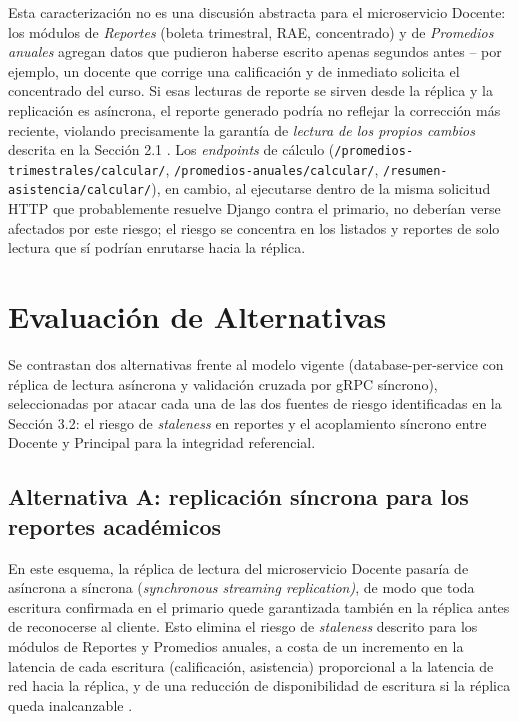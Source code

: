 \documentclass[11pt,a4paper]{article}
\begin{document}
Esta caracterización no es una discusión abstracta para el microservicio Docente: los módulos de \emph{Reportes} (boleta trimestral, RAE, concentrado) y de \emph{Promedios anuales} agregan datos que pudieron haberse escrito apenas segundos antes -- por ejemplo, un docente que corrige una calificación y de inmediato solicita el concentrado del curso. Si esas lecturas de reporte se sirven desde la réplica y la replicación es asíncrona, el reporte generado podría no reflejar la corrección más reciente, violando precisamente la garantía de \emph{lectura de los propios cambios} descrita en la Sección 2.1 \cite{viotti2016}. Los \emph{endpoints} de cálculo (\texttt{/promedios-trimestrales/calcular/}, \texttt{/promedios-anuales/calcular/}, \texttt{/resumen-asistencia/calcular/}), en cambio, al ejecutarse dentro de la misma solicitud
HTTP que probablemente resuelve Django contra el primario, no deberían verse afectados por este riesgo; el riesgo se concentra en los listados y reportes de solo lectura que sí podrían enrutarse hacia la réplica.

\section{Evaluación de Alternativas}

Se contrastan dos alternativas frente al modelo vigente (database-per-service con réplica de lectura asíncrona y validación cruzada por gRPC síncrono), seleccionadas por atacar cada una de las dos fuentes de riesgo identificadas en la Sección 3.2: el riesgo de \emph{staleness} en reportes y el acoplamiento síncrono entre Docente y Principal para la integridad referencial.

\subsection{Alternativa A: replicación síncrona para los reportes académicos}

En este esquema, la réplica de lectura del microservicio Docente pasaría de asíncrona a síncrona (\emph{synchronous streaming replication)}, de modo que toda escritura confirmada en el primario quede garantizada también en la réplica antes de reconocerse al cliente. Esto elimina el riesgo de \emph{staleness} descrito para los módulos de Reportes y Promedios anuales, a costa de un incremento en la latencia de cada escritura (calificación, asistencia)
proporcional a la latencia de red hacia la réplica, y de una reducción de disponibilidad de escritura si la réplica queda inalcanzable \cite{bailis2013}.
\end{document}
